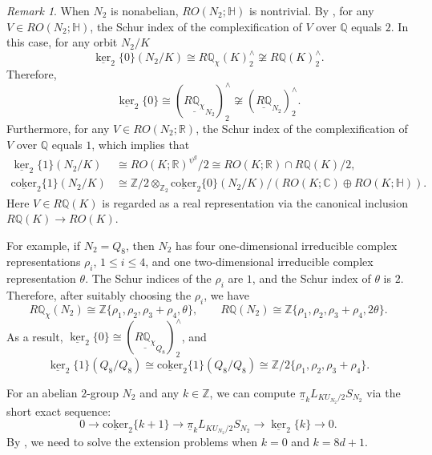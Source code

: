 \documentclass{amsart}
\theoremstyle{plain}
\theoremstyle{definition}
\theoremstyle{remark}
\newtheorem{remark}[theorem]{Remark}
\begin{document}
\begin{remark}\label{rmk: nilpotent N_2}
    When $N_2$ is nonabelian, $RO(N_2;\mathbb{H})$ is nontrivial. By \cite[Chapter 13]{serre1977linear}, for any $V\in RO(N_2;\mathbb{H})$, the Schur index of the complexification of $V$ over $\mathbb{Q}$ equals $2$. In this case, for any orbit $N_2/K$
    \[
    \underline{\ker}_2\{0\}(N_2/K)\cong R\mathbb{Q}_\chi (K)_2^\wedge\not\cong R\mathbb{Q}(K)_2^\wedge.
    \]
    Therefore,
    $$\underline{\ker}_2\{0\}\cong (\underline{R\mathbb{Q}_{\chi}}_{N_2})_2^\wedge \not\cong (\underline{R\mathbb{Q}}_{N_2})_2^\wedge.$$
    Furthermore, for any  $V\in RO(N_2;\mathbb{R})$, the Schur index of the complexification of $V$ over $\mathbb{Q}$ equals $1$, which implies that 
    \[
    \begin{aligned}
        \underline{\ker}_2\{1\}(N_2/K)&\cong RO(K;\mathbb{R})^{\psi^g}/2 \cong RO(K;\mathbb{R})\cap R\mathbb{Q}(K)/2,\\
        \underline{\mathrm{coker}}_2\{1\}(N_2/K) &\cong \mathbb{Z}/2\otimes_{\mathbb{Z}_2}\underline{\mathrm{coker}}_2\{0\}(N_2/K)/(RO(K;\mathbb{C})\oplus RO(K;\mathbb{H})).
    \end{aligned}
    \] 
    Here $V\in R\mathbb{Q}(K)$ is regarded as a real representation via the canonical inclusion $R\mathbb{Q}(K)\to RO(K)$.

For example, if $N_2=Q_8$, then $N_2$ has four one-dimensional irreducible complex representations $\rho_i$, $1\leq i\leq 4$, and one two-dimensional irreducible complex representation $\theta$. The Schur indices of the $\rho_i$ are $1$, and the Schur index of $\theta$ is $2$. Therefore, after suitably choosing the $\rho_i$, we have 
$$R\mathbb{Q}_\chi (N_2)\cong \mathbb{Z}\{\rho_1,\rho_2,\rho_3+\rho_4,\theta\},
\qquad
R\mathbb{Q}(N_2)\cong \mathbb{Z}\{\rho_1,\rho_2,\rho_3+\rho_4,2\theta\}.$$ 
As a result, $\underline{\ker}_2\{0\}\cong (\underline{R\mathbb{Q}_{\chi}}_{Q_8})_2^\wedge$, and $$\underline{\ker}_2\{1\}(Q_8/Q_8)\cong \underline{\mathrm{coker}}_2\{1\}(Q_8/Q_8) \cong \mathbb{Z}/2\{\rho_1,\rho_2, \rho_3+\rho_4\}.$$
\end{remark}

For an abelian $2$-group $N_2$ and any $k\in \mathbb{Z}$, we can compute $\underline{\pi}_k L_{KU_{N_2}/2}S_{N_2}$ via the short exact sequence:
    \[0\longrightarrow \underline{\mathrm{coker}}_2\{k+1\}\longrightarrow \underline{\pi}_k L_{KU_{N_2}/2}S_{N_2} \longrightarrow \underline{\ker}_2\{k\}\longrightarrow 0.\]
By , we need to solve the extension problems when $k=0$ and $k=8d+1$.
\end{document}

